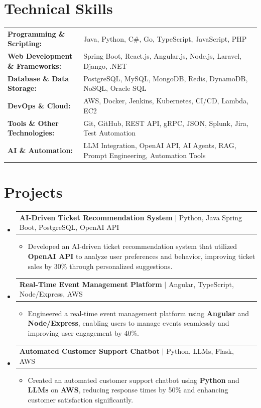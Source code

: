 \documentclass[letterpaper,10pt]{article}
\makeatletter
\newcommand{\resumeItem}[1]{
  \item{\fontsize{8pt}{9pt}\selectfont
    #1 \vspace{-3pt}
  }
}
\newcommand{\resumeProjectHeading}[2]{
    \item
    \begin{tabular*}{1.001\textwidth}{l@{\extracolsep{\fill}}r}
      \fontsize{8.5pt}{10pt}#1 & \textbf{\fontsize{8.5pt}{10pt} #2}\\
    \end{tabular*}\vspace{-7pt}
}
\newcommand{\resumeSubHeadingListStart}{\begin{itemize}[leftmargin=0pt, label={}]}
\newcommand{\resumeSubHeadingListEnd}{\end{itemize}}
\newcommand{\resumeItemListStart}{\begin{itemize}[leftmargin=*]}
\newcommand{\resumeItemListEnd}{\end{itemize}\vspace{-5pt}}
\makeatother
\begin{document}
\section{Technical Skills}
        \vspace{-14pt}
        \begin{table}[h]
            \fontsize{8pt}{9pt}\selectfont
            \begin{tabular}{p{0.3\linewidth} p{0.7\linewidth}}
                \textbf{Programming \& Scripting:} & Java, Python, C\#, Go, TypeScript, JavaScript, PHP \\
                \textbf{Web Development \& Frameworks:} & Spring Boot, React.js, Angular.js, Node.js, Laravel, Django, .NET \\
                \textbf{Database \& Data Storage:} & PostgreSQL, MySQL, MongoDB, Redis, DynamoDB, NoSQL, Oracle SQL \\
                \textbf{DevOps \& Cloud:} & AWS, Docker, Jenkins, Kubernetes, CI/CD, Lambda, EC2 \\
                \textbf{Tools \& Other Technologies:} & Git, GitHub, REST API, gRPC, JSON, Splunk, Jira, Test Automation \\
                \textbf{AI \& Automation:} & LLM Integration, OpenAI API, AI Agents, RAG, Prompt Engineering, Automation Tools \\
            \end{tabular}
        \end{table}
 \vspace{-18pt}

\section{Projects}
    \vspace{-5pt}
    \resumeSubHeadingListStart
          \resumeProjectHeading
            {\textbf{AI-Driven Ticket Recommendation System} $|$ Python, Java Spring Boot, PostgreSQL, OpenAI API}{}
            \resumeItemListStart
                \resumeItem{Developed an AI-driven ticket recommendation system that utilized \textbf{OpenAI API} to analyze user preferences and behavior, improving ticket sales by 30\% through personalized suggestions.}
            \resumeItemListEnd
        \vspace{-12pt}
    
        \resumeProjectHeading
            {\textbf{Real-Time Event Management Platform} $|$ Angular, TypeScript, Node/Express, AWS}{}
        \resumeItemListStart
                \resumeItem{Engineered a real-time event management platform using \textbf{Angular} and \textbf{Node/Express}, enabling users to manage events seamlessly and improving user engagement by 40\%.}
        \resumeItemListEnd
      \vspace{-12pt}
      \resumeProjectHeading
        {\textbf{Automated Customer Support Chatbot} $|$ Python, LLMs, Flask, AWS}{}
    \resumeItemListStart
            \resumeItem{Created an automated customer support chatbot using \textbf{Python} and \textbf{LLMs} on \textbf{AWS}, reducing response times by 50\% and enhancing customer satisfaction significantly.}
    \resumeItemListEnd
    \resumeSubHeadingListEnd
\end{document}
